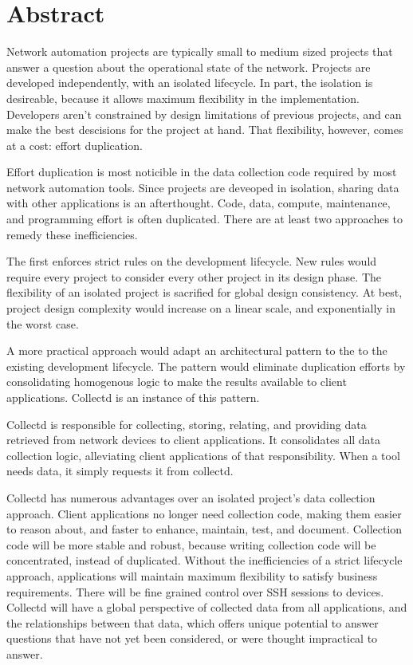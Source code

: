 %
\chapter*{Abstract}
\label{sec:abstract}
\vspace*{-10mm}

Network automation projects are typically small to medium sized projects
that answer a question about the operational state of the network. Projects 
are developed independently, with an isolated lifecycle.
In part, the isolation is desireable, because it allows maximum 
flexibility in the implementation. Developers aren't constrained
by design limitations of previous projects, and can make the best descisions for
the project at hand. That flexibility, however, comes at a cost: effort duplication. 

Effort duplication is most noticible in the data collection code required 
by most network automation tools. Since projects are deveoped in isolation, 
sharing data with other applications is an afterthought. Code, data,
compute, maintenance, and programming effort is often duplicated. There are at least
two approaches to remedy these inefficiencies. 

The first enforces strict rules on the development lifecycle. New rules
would require every project to consider every other project in its design phase. 
The flexibility of an isolated project is sacrified for global design consistency.
At best, project design complexity would increase on a linear scale, and 
exponentially in the worst case.

A more practical approach would adapt an architectural pattern to the to the 
existing development lifecycle. The pattern would eliminate duplication
efforts by consolidating homogenous logic to make the results available to
client applications. Collectd is an instance of this pattern. 

Collectd is responsible for collecting, storing, relating, and providing data retrieved 
from network devices to client applications. It consolidates all data 
collection logic, alleviating client applications of that responsibility.
When a tool needs data, it simply requests it from collectd. 

Collectd has numerous advantages over an isolated project's data collection approach. 
Client applications no longer need collection code, making them easier to reason
about, and faster to enhance, maintain, test, and document. Collection code will
be more stable and robust, because writing collection code will be concentrated,
instead of duplicated. Without the inefficiencies of a strict lifecycle approach, 
applications will maintain maximum flexibility to satisfy business requirements.
There will be fine grained control over SSH sessions to devices. Collectd will
have a global perspective of collected data from all applications, and the 
relationships between that data, which offers unique potential to answer 
questions that have not yet been considered, or were thought impractical to 
answer.
